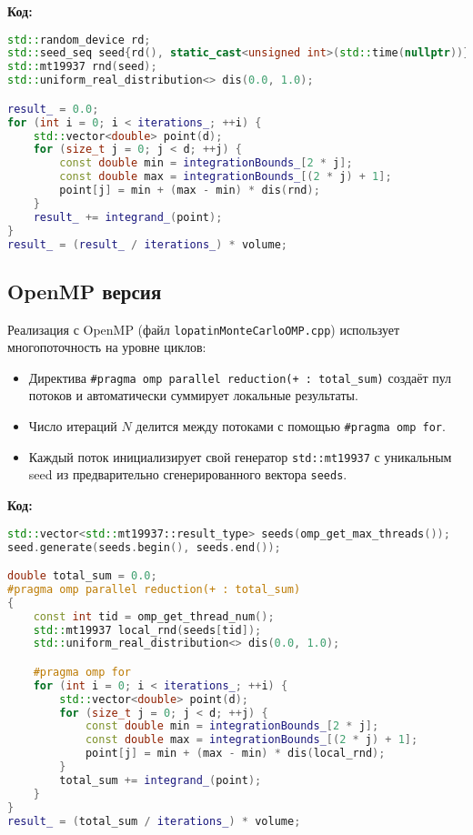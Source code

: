 \documentclass[12pt,a4paper]{extarticle}
\begin{document}
\textbf{Код:}
\begin{lstlisting}[language=C++]
std::random_device rd;
std::seed_seq seed{rd(), static_cast<unsigned int>(std::time(nullptr))};
std::mt19937 rnd(seed);
std::uniform_real_distribution<> dis(0.0, 1.0);

result_ = 0.0;
for (int i = 0; i < iterations_; ++i) {
    std::vector<double> point(d);
    for (size_t j = 0; j < d; ++j) {
        const double min = integrationBounds_[2 * j];
        const double max = integrationBounds_[(2 * j) + 1];
        point[j] = min + (max - min) * dis(rnd);
    }
    result_ += integrand_(point);
}
result_ = (result_ / iterations_) * volume;
\end{lstlisting}

\subsection{OpenMP версия}
Реализация с OpenMP (файл \texttt{lopatinMonteCarloOMP.cpp}) использует многопоточность на уровне циклов:
\begin{itemize}
    \item Директива \texttt{\#pragma omp parallel reduction(+ : total\_sum)} создаёт пул потоков и автоматически суммирует локальные результаты.
    \item Число итераций \(N\) делится между потоками с помощью \texttt{\#pragma omp for}.
    \item Каждый поток инициализирует свой генератор \texttt{std::mt19937} с уникальным seed из предварительно сгенерированного вектора \texttt{seeds}.
\end{itemize}

\textbf{Код:}
\begin{lstlisting}[language=C++]
std::vector<std::mt19937::result_type> seeds(omp_get_max_threads());
seed.generate(seeds.begin(), seeds.end());

double total_sum = 0.0;
#pragma omp parallel reduction(+ : total_sum)
{
    const int tid = omp_get_thread_num();
    std::mt19937 local_rnd(seeds[tid]);
    std::uniform_real_distribution<> dis(0.0, 1.0);

    #pragma omp for
    for (int i = 0; i < iterations_; ++i) {
        std::vector<double> point(d);
        for (size_t j = 0; j < d; ++j) {
            const double min = integrationBounds_[2 * j];
            const double max = integrationBounds_[(2 * j) + 1];
            point[j] = min + (max - min) * dis(local_rnd);
        }
        total_sum += integrand_(point);
    }
}
result_ = (total_sum / iterations_) * volume;
\end{lstlisting}
\end{document}
